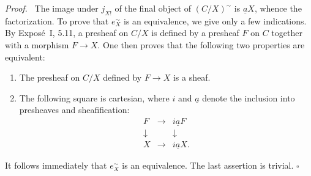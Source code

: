 \documentclass[11pt]{article}
\newcommand{\qedtext}{\hfill\(\square\)}
\newenvironment{prooftext}{\par\noindent\emph{Proof.}\ }{\par\medskip}
\begin{document}
\begin{prooftext}
The image under \(j_{X!}\) of the final object of \((C/X)^\sim\) is \(\underline aX\), whence the factorization. To prove that \(e_X^\sim\) is an equivalence, we give only a few indications. By Expos\'e~I, 5.11, a presheaf on \(C/X\) is defined by a presheaf \(F\) on \(C\) together with a morphism \(F\to X\). One then proves that the following two properties are equivalent:
\begin{enumerate}[label=\roman*)]
\item The presheaf on \(C/X\) defined by \(F\to X\) is a sheaf.
\item The following square is cartesian, where \(i\) and \(\underline a\) denote the inclusion into presheaves and sheafification:
\[
\begin{array}{ccc}
F&\longrightarrow&i\underline aF\\
\downarrow&&\downarrow\\
X&\longrightarrow&i\underline aX.
\end{array}
\]
\end{enumerate}
It follows immediately that \(e_X^\sim\) is an equivalence. The last assertion is trivial. \qedtext
\end{prooftext}
\end{document}
